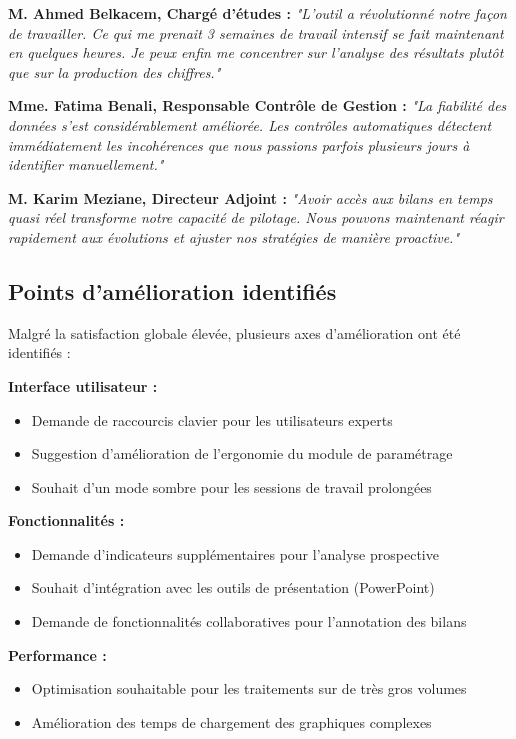 \medskip

\textbf{M. Ahmed Belkacem, Chargé d'études :}
\textit{"L'outil a révolutionné notre façon de travailler. Ce qui me prenait 3 semaines de travail intensif se fait maintenant en quelques heures. Je peux enfin me concentrer sur l'analyse des résultats plutôt que sur la production des chiffres."}

\textbf{Mme. Fatima Benali, Responsable Contrôle de Gestion :}
\textit{"La fiabilité des données s'est considérablement améliorée. Les contrôles automatiques détectent immédiatement les incohérences que nous passions parfois plusieurs jours à identifier manuellement."}

\textbf{M. Karim Meziane, Directeur Adjoint :}
\textit{"Avoir accès aux bilans en temps quasi réel transforme notre capacité de pilotage. Nous pouvons maintenant réagir rapidement aux évolutions et ajuster nos stratégies de manière proactive."}

\subsection{Points d'amélioration identifiés}

Malgré la satisfaction globale élevée, plusieurs axes d'amélioration ont été identifiés :

\medskip

\textbf{Interface utilisateur :}
\begin{itemize}
    \item Demande de raccourcis clavier pour les utilisateurs experts
    \item Suggestion d'amélioration de l'ergonomie du module de paramétrage
    \item Souhait d'un mode sombre pour les sessions de travail prolongées
\end{itemize}

\textbf{Fonctionnalités :}
\begin{itemize}
    \item Demande d'indicateurs supplémentaires pour l'analyse prospective
    \item Souhait d'intégration avec les outils de présentation (PowerPoint)
    \item Demande de fonctionnalités collaboratives pour l'annotation des bilans
\end{itemize}

\textbf{Performance :}
\begin{itemize}
    \item Optimisation souhaitable pour les traitements sur de très gros volumes
    \item Amélioration des temps de chargement des graphiques complexes
\end{itemize}

